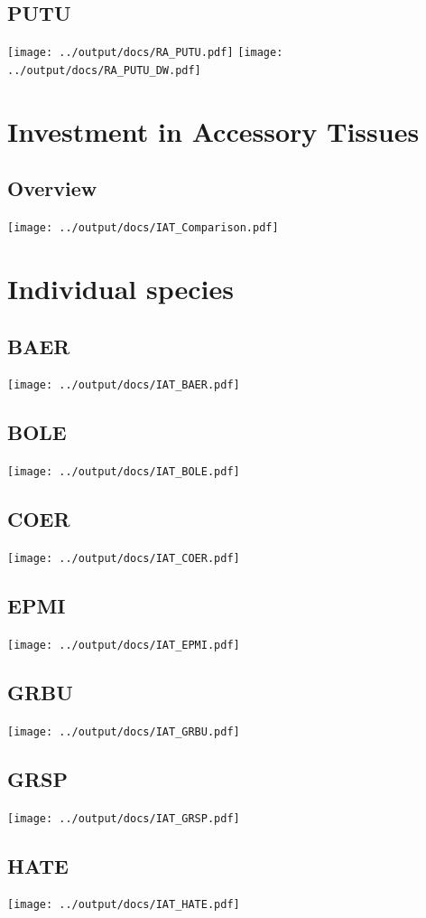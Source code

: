 \documentclass[10pt]{book} %
\begin{document}
\clearpage
\newpage
\subsection{PUTU}
\texttt{[image: ../output/docs/RA\_PUTU.pdf]}
{\center\texttt{[image: ../output/docs/RA\_PUTU\_DW.pdf]}}

\newpage
\section{Investment in Accessory Tissues}
\subsection{Overview}
\texttt{[image: ../output/docs/IAT\_Comparison.pdf]}
\clearpage
\newpage
\section{Individual species}
\subsection{BAER}
\texttt{[image: ../output/docs/IAT\_BAER.pdf]}

\subsection{BOLE}
\texttt{[image: ../output/docs/IAT\_BOLE.pdf]}

\subsection{COER}
\texttt{[image: ../output/docs/IAT\_COER.pdf]}

\subsection{EPMI}
\texttt{[image: ../output/docs/IAT\_EPMI.pdf]}

\subsection{GRBU}
\texttt{[image: ../output/docs/IAT\_GRBU.pdf]}

\subsection{GRSP}
\texttt{[image: ../output/docs/IAT\_GRSP.pdf]}

\subsection{HATE}
\texttt{[image: ../output/docs/IAT\_HATE.pdf]}
\end{document}
